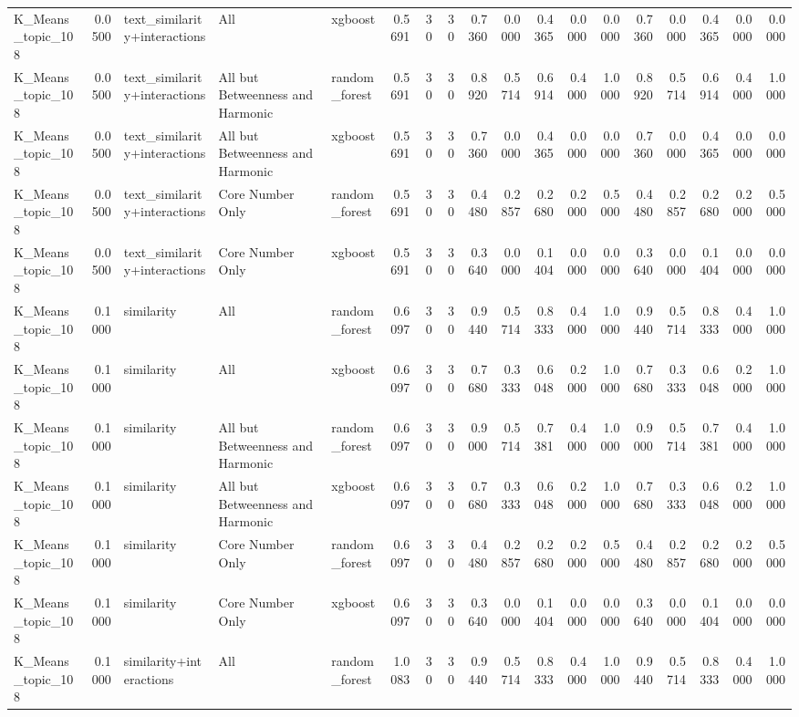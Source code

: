 \begin{tabular}{lrlllrrrrrrrrrrrrr}
K_Means_topic_108 & 0.0500 & text_similarity+interactions & All & xgboost & 0.5691 & 30 & 30 & 0.7360 & 0.0000 & 0.4365 & 0.0000 & 0.0000 & 0.7360 & 0.0000 & 0.4365 & 0.0000 & 0.0000 \\
K_Means_topic_108 & 0.0500 & text_similarity+interactions & All but Betweenness and Harmonic & random_forest & 0.5691 & 30 & 30 & 0.8920 & 0.5714 & 0.6914 & 0.4000 & 1.0000 & 0.8920 & 0.5714 & 0.6914 & 0.4000 & 1.0000 \\
K_Means_topic_108 & 0.0500 & text_similarity+interactions & All but Betweenness and Harmonic & xgboost & 0.5691 & 30 & 30 & 0.7360 & 0.0000 & 0.4365 & 0.0000 & 0.0000 & 0.7360 & 0.0000 & 0.4365 & 0.0000 & 0.0000 \\
K_Means_topic_108 & 0.0500 & text_similarity+interactions & Core Number Only & random_forest & 0.5691 & 30 & 30 & 0.4480 & 0.2857 & 0.2680 & 0.2000 & 0.5000 & 0.4480 & 0.2857 & 0.2680 & 0.2000 & 0.5000 \\
K_Means_topic_108 & 0.0500 & text_similarity+interactions & Core Number Only & xgboost & 0.5691 & 30 & 30 & 0.3640 & 0.0000 & 0.1404 & 0.0000 & 0.0000 & 0.3640 & 0.0000 & 0.1404 & 0.0000 & 0.0000 \\
K_Means_topic_108 & 0.1000 & similarity & All & random_forest & 0.6097 & 30 & 30 & 0.9440 & 0.5714 & 0.8333 & 0.4000 & 1.0000 & 0.9440 & 0.5714 & 0.8333 & 0.4000 & 1.0000 \\
K_Means_topic_108 & 0.1000 & similarity & All & xgboost & 0.6097 & 30 & 30 & 0.7680 & 0.3333 & 0.6048 & 0.2000 & 1.0000 & 0.7680 & 0.3333 & 0.6048 & 0.2000 & 1.0000 \\
K_Means_topic_108 & 0.1000 & similarity & All but Betweenness and Harmonic & random_forest & 0.6097 & 30 & 30 & 0.9000 & 0.5714 & 0.7381 & 0.4000 & 1.0000 & 0.9000 & 0.5714 & 0.7381 & 0.4000 & 1.0000 \\
K_Means_topic_108 & 0.1000 & similarity & All but Betweenness and Harmonic & xgboost & 0.6097 & 30 & 30 & 0.7680 & 0.3333 & 0.6048 & 0.2000 & 1.0000 & 0.7680 & 0.3333 & 0.6048 & 0.2000 & 1.0000 \\
K_Means_topic_108 & 0.1000 & similarity & Core Number Only & random_forest & 0.6097 & 30 & 30 & 0.4480 & 0.2857 & 0.2680 & 0.2000 & 0.5000 & 0.4480 & 0.2857 & 0.2680 & 0.2000 & 0.5000 \\
K_Means_topic_108 & 0.1000 & similarity & Core Number Only & xgboost & 0.6097 & 30 & 30 & 0.3640 & 0.0000 & 0.1404 & 0.0000 & 0.0000 & 0.3640 & 0.0000 & 0.1404 & 0.0000 & 0.0000 \\
K_Means_topic_108 & 0.1000 & similarity+interactions & All & random_forest & 1.0083 & 30 & 30 & 0.9440 & 0.5714 & 0.8333 & 0.4000 & 1.0000 & 0.9440 & 0.5714 & 0.8333 & 0.4000 & 1.0000 \\

\end{tabular}
